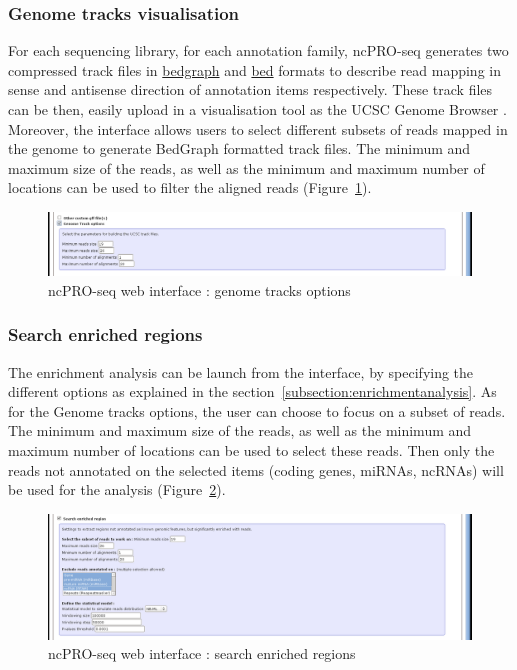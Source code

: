 \documentclass[12pt]{article}
\def \ncpip{ncPRO-seq}
\begin{document}
\subsubsection{Genome tracks visualisation}
For each sequencing library,  for each annotation family, \ncpip{} generates two compressed track files in \href{http://genome.ucsc.edu/goldenPath/help/bedgraph.html}{bedgraph} and \href{http://genome.ucsc.edu/FAQ/FAQformat.html#format1format}{bed} formats to describe read mapping in sense and antisense direction of annotation items respectively. These track files can be then, easily upload in a visualisation tool as the UCSC Genome Browser \cite{Dreszer2012}.\\
Moreover, the interface allows users to select different subsets of reads mapped in the genome to generate BedGraph formatted track files.
The minimum and maximum size of the reads, as well as the minimum and maximum number of locations can be used to filter the aligned reads (Figure~\ref{fig:web6}).
\begin{figure}[!h]
\includegraphics[width=\textwidth]{web_6.png}
\caption{\ncpip{} web interface : genome tracks options}
\label{fig:web6}
\end{figure}
\subsubsection{Search enriched regions}
The enrichment analysis can be launch from the interface, by specifying the different options as explained in the section~\ref{subsection:enrichmentanalysis}.
As for the Genome tracks options, the user can choose to focus on a subset of reads. The minimum and maximum size of the reads, as well as the minimum and maximum number of locations can be used to select these reads. Then only the reads not annotated on the selected items (coding genes, miRNAs, ncRNAs) will be used for the analysis (Figure~\ref{fig:web7}).
\begin{figure}[!h]
\includegraphics[width=\textwidth]{web_7.png}
\caption{\ncpip{} web interface : search enriched regions}
\label{fig:web7}
\end{figure}
\end{document}
